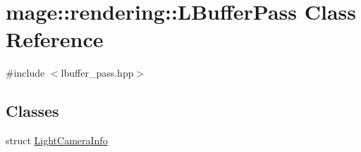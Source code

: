 \hypertarget{classmage_1_1rendering_1_1_l_buffer_pass}{}\section{mage\+:\+:rendering\+:\+:L\+Buffer\+Pass Class Reference}
\label{classmage_1_1rendering_1_1_l_buffer_pass}


{\ttfamily \#include $<$lbuffer\+\_\+pass.\+hpp$>$}

\subsection*{Classes}
\begin{DoxyCompactItemize}
\item 
struct \hyperlink{structmage_1_1rendering_1_1_l_buffer_pass_1_1_light_camera_info}{Light\+Camera\+Info}
\end{DoxyCompactItemize}
